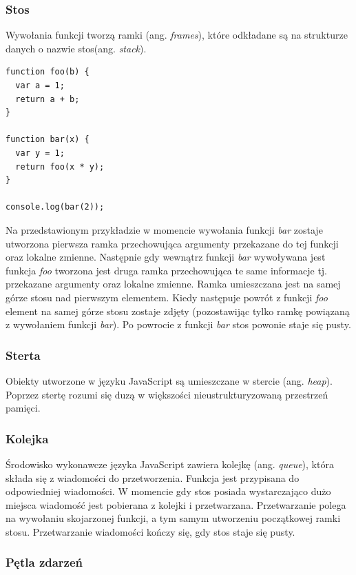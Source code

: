 \documentclass[polish, twoside, 12pt]{mwart}
\begin{document}
\subsubsection{Stos}

Wywołania funkcji tworzą ramki (ang. \emph{frames}), które odkładane są na strukturze danych o nazwie stos(ang. \emph{stack}).

\begin{lstlisting}
function foo(b) {
  var a = 1;
  return a + b;
}

function bar(x) {
  var y = 1;
  return foo(x * y);
}

console.log(bar(2));
\end{lstlisting}

Na przedstawionym przykładzie w momencie wywołania funkcji \emph{bar} zostaje utworzona pierwsza ramka przechowująca argumenty przekazane do tej funkcji oraz lokalne zmienne. Następnie gdy wewnątrz funkcji \emph{bar} wywoływana jest funkcja \emph{foo} tworzona jest druga ramka przechowująca te same informacje tj. przekazane argumenty oraz lokalne zmienne. Ramka umieszczana jest na samej górze stosu nad pierwszym elementem. Kiedy następuje powrót z funkcji \emph{foo} element na samej górze stosu zostaje zdjęty (pozostawijąc tylko ramkę powiązaną z wywołaniem funkcji \emph{bar}). Po powrocie z funkcji \emph{bar} stos powonie staje się pusty.

\subsubsection{Sterta}

Obiekty utworzone w języku JavaScript są umieszczane w stercie (ang. \emph{heap}). Poprzez stertę rozumi się duzą w większości nieustrukturyzowaną przestrzeń pamięci.

\subsubsection{Kolejka}

Środowisko wykonawcze języka JavaScript zawiera kolejkę (ang. \emph{queue}), która składa się z wiadomości do przetworzenia. Funkcja jest przypisana do odpowiedniej wiadomości. W momencie gdy stos posiada wystarczająco dużo miejsca wiadomość jest pobierana z kolejki i przetwarzana. Przetwarzanie polega na wywołaniu skojarzonej funkcji, a tym samym utworzeniu początkowej ramki stosu.
Przetwarzanie wiadomości kończy się, gdy stos staje się pusty.

\subsubsection{Pętla zdarzeń}
\end{document}
